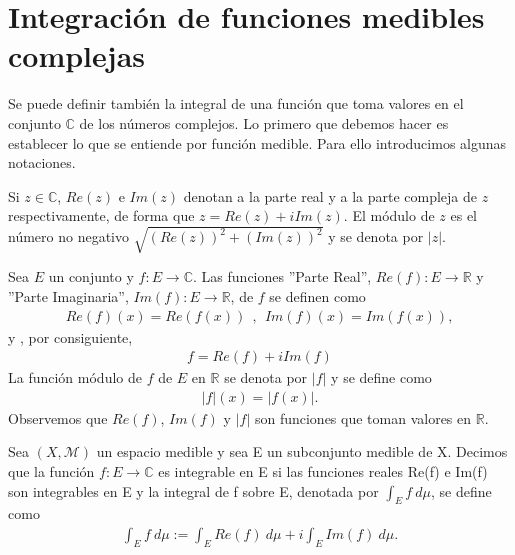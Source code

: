 \section{Integración de funciones medibles complejas}

Se puede definir también la integral de una función que toma valores en el conjunto $\mathbb{C}$ de los números complejos. Lo primero que debemos hacer es establecer lo que se entiende por función medible. Para ello introducimos algunas notaciones.

Si $z \in \mathbb{C}$, $Re(z)$ e $Im(z)$ denotan a la parte real y a la parte compleja de $z$ respectivamente, de forma que $z = Re(z) + iIm(z)$. El módulo de $z$ es el número no negativo $\sqrt{(Re(z))^2 + (Im(z))^2}$ y se denota por $|z|$.

Sea $E$ un conjunto y $f: E \longrightarrow \mathbb{C}$. Las funciones ''Parte Real'', $Re(f): E \longrightarrow \mathbb{R}$ y ''Parte Imaginaria'', $Im(f): E \longrightarrow \mathbb{R}$, de $f$ se definen como
\begin{align*}
    Re(f)(x) = Re(f(x)) \ \ , \ \ Im(f)(x) = Im(f(x)),
\end{align*}
y , por consiguiente,
\begin{align*}
    f = Re(f) + iIm(f)
\end{align*}
La función módulo de $f$ de $E$ en $\mathbb{R}$ se denota por $|f|$ y se define como
\begin{align*}
    |f|(x) = |f(x)|.
\end{align*}
Observemos que $Re(f)$, $Im(f)$ y $|f|$ son funciones que toman valores en $\mathbb{R}$.

\begin{defi}
    Sea $(X, \mathcal{M})$ un espacio medible y sea E un subconjunto medible de X. Decimos que la función $f: E \longrightarrow \mathbb{C}$ es integrable en E si las funciones reales Re(f) e Im(f) son integrables en E y la integral de f sobre E, denotada por $\int_{E}{f \ d\mu}$, se define como
    \begin{align*}
        \int_{E}{f \ d\mu} := \int_{E}{Re(f) \ d\mu} + i\int_{E}{Im(f) \ d\mu}.
    \end{align*}
\end{defi}

